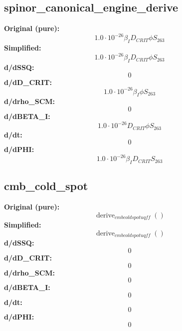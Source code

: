 \subsection{spinor_canonical_engine_derive}
\textbf{Original (pure):}
\begin{equation}
1.0 \cdot 10^{-26} \beta_{I} D_{CRIT} \phi S_{26 3}
\end{equation}
\textbf{Simplified:}
\begin{equation}
1.0 \cdot 10^{-26} \beta_{I} D_{CRIT} \phi S_{26 3}
\end{equation}
\textbf{d/dSSQ:}
\begin{equation}
0
\end{equation}
\textbf{d/dD_CRIT:}
\begin{equation}
1.0 \cdot 10^{-26} \beta_{I} \phi S_{26 3}
\end{equation}
\textbf{d/drho_SCM:}
\begin{equation}
0
\end{equation}
\textbf{d/dBETA_I:}
\begin{equation}
1.0 \cdot 10^{-26} D_{CRIT} \phi S_{26 3}
\end{equation}
\textbf{d/dt:}
\begin{equation}
0
\end{equation}
\textbf{d/dPHI:}
\begin{equation}
1.0 \cdot 10^{-26} \beta_{I} D_{CRIT} S_{26 3}
\end{equation}

\subsection{cmb_cold_spot}
\textbf{Original (pure):}
\begin{equation}
\operatorname{derive}_{cmb cold spot uqff}{\left( \right)}
\end{equation}
\textbf{Simplified:}
\begin{equation}
\operatorname{derive}_{cmb cold spot uqff}{\left( \right)}
\end{equation}
\textbf{d/dSSQ:}
\begin{equation}
0
\end{equation}
\textbf{d/dD_CRIT:}
\begin{equation}
0
\end{equation}
\textbf{d/drho_SCM:}
\begin{equation}
0
\end{equation}
\textbf{d/dBETA_I:}
\begin{equation}
0
\end{equation}
\textbf{d/dt:}
\begin{equation}
0
\end{equation}
\textbf{d/dPHI:}
\begin{equation}
0
\end{equation}

